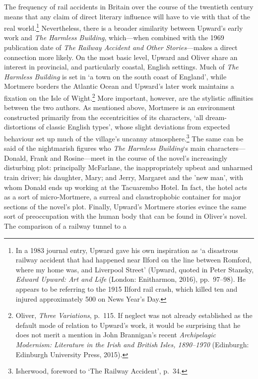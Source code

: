 \documentclass[]{article}
\begin{document}
The frequency of rail accidents in Britain over the course of the
twentieth century means that any claim of direct literary influence will
have to vie with that of the real world.\footnote{In a 1983 journal
  entry, Upward gave his own inspiration as ‘a disastrous railway
  accident that had happened near Ilford on the line between Romford,
  where my home was, and Liverpool Street’ (Upward, quoted in Peter
  Stansky, \emph{Edward Upward: Art and Life} (London: Enitharmon,
  2016), pp.~97–98). He appears to be referring to the 1915 Ilford rail
  crash, which killed ten and injured approximately 500 on News Year’s
  Day.} Nevertheless, there is a broader similarity between Upward’s
early work and \emph{The Harmless Building}, which—when combined with
the 1969 publication date of \emph{The Railway Accident and Other
Stories}—makes a direct connection more likely. On the most basic level,
Upward and Oliver share an interest in provincial, and particularly
coastal, English settings. Much of \emph{The Harmless Building} is set
in ‘a town on the south coast of England’, while Mortmere borders the
Atlantic Ocean and Upward’s later work maintains a fixation on the Isle
of Wight.\footnote{Oliver, \emph{Three Variations}, p.~115. If neglect
  was not already established as the default mode of relation to
  Upward’s work, it would be surprising that he does not merit a mention
  in John Brannigan’s recent \emph{Archipelagic Modernism: Literature in
  the Irish and British Isles, 1890–1970} (Edinburgh: Edinburgh
  University Press, 2015).} More important, however, are the stylistic
affinities between the two authors. As mentioned above, Mortmere is an
environment constructed primarily from the eccentricities of its
characters, ‘all dream-distortions of classic English types’, whose
slight deviations from expected behaviour set up much of the village’s
uncanny atmosphere.\footnote{Isherwood, foreword to ‘The Railway
  Accident’, p.~34.} The same can be said of the nightmarish figures who
\emph{The Harmless Building}‘s main characters—Donald, Frank and
Rosine—meet in the course of the novel’s increasingly disturbing plot:
principally McFarlane, the inappropriately upbeat and unharmed train
driver; his daughter, Mary; and Jerry, Margaret and the ’new man’, with
whom Donald ends up working at the Tacuarembo Hotel. In fact, the hotel
acts as a sort of micro-Mortmere, a surreal and claustrophobic container
for major sections of the novel’s plot. Finally, Upward’s Mortmere
stories evince the same sort of preoccupation with the human body that
can be found in Oliver’s novel. The comparison of a railway tunnel to a
\end{document}
